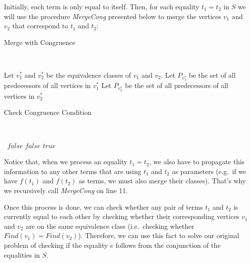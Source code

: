 Initially, each term is only equal to itself. Then, for each equality $t_{1} = t_{2}$ in $S$ we will use the procedure \textit{MergeCong} presented below to merge the vertices $v_{1}$ and $v_{2}$ that correspond to $t_{1}$ and $t_{2}$:

\renewcommand{\algorithmicforall}{\textbf{for each}}
\MakeRobust{\Call}

\begin{algorithm}[H]
\caption{Merge with Congruence}~\label{merge_cong}
\begin{algorithmic}[1]
    \State\Return
  \EndIf
  \State Let $v_{1}^{*}$ and $v_{2}^{*}$ be the equivalence classes of $v_{1}$ and $v_{2}$.
  \State Let $P_{v_{1}^{*}}$ be the set of all predecessors of all vertices in $v_{1}^{*}$
  \State Let $P_{v_{2}^{*}}$ be the set of all predecessors of all vertices in $v_{2}^{*}$
  \State{}
      \State{}
    \EndIf
  \EndFor
  \EndFunction
\end{algorithmic}
\end{algorithm}

\begin{algorithm}[H]
\caption{Check Congruence Condition}~\label{cong_cond}
\begin{algorithmic}[1]
    \State\Return~$false$
  \EndIf
      \State\Return $false$
    \EndIf
  \EndFor
  \State\Return $true$
  \EndFunction
\end{algorithmic}
\end{algorithm}

Notice that, when we process an equality $t_{1} = t_{2}$, we also have to propagate this information to any other terms that are using $t_{1}$ and $t_{2}$ as parameters (e.g.~if we have $f(t_{1})$ and $f(t_{2})$ as terms, we must also merge their classes). That's why we recursively call \textit{MergeCong} on line 11.

Once this process is done, we can check whether any pair of terms $t_{1}$ and $t_{2}$ is currently equal to each other by checking whether their corresponding vertices $v_{1}$ and $v_{2}$ are on the same equivalence class (i.e.\ checking whether $Find(v_{1}) = Find(v_{2})$). Therefore, we can use this fact to solve our original problem of checking if the equality $e$ follows from the conjunction of the equalities in $S$.

